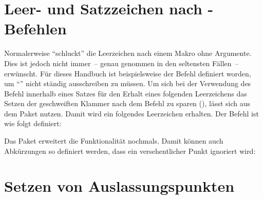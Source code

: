 \section{%
  Leer- und Satzzeichen nach -Befehlen%
  \label{sec:tips:xspace}%
}

Normalerweise \enquote{schluckt}  die Leerzeichen nach einem 
Makro ohne Argumente. Dies ist jedoch nicht immer~-- genau genommen in den 
seltensten Fällen~-- erwünscht. Für dieses Handbuch ist beispielsweise der 
Befehl  definiert worden, um \enquote{\TUD{}} nicht ständig 
ausschreiben zu müssen. Um sich bei der Verwendung des Befehl innerhalb eines 
Satzes für den Erhalt eines folgenden Leerzeichens das Setzen der geschweiften 
Klammer nach dem Befehl zu sparen (), lässt sich 
 aus dem Paket  nutzen. Damit wird ein folgendes 
Leerzeichen erhalten. Der Befehl  ist wie folgt definiert:
%
\begin{quoting}
\begin{Code}
\newcommand*{\TUD}{Technische Universit\"at Dresden\xspace}
\end{Code}
\end{quoting}
%
Das Paket  erweitert die Funktionalität nochmals. Damit 
können auch Abkürzungen so definiert werden, dass ein versehentlicher Punkt 
ignoriert wird:
%
\begin{quoting}
\begin{Code}
\newcommand*{\zB}{z.\,B\xperiod}
\end{Code}
\end{quoting}



\section{%
  Setzen von Auslassungspunkten%
  \label{sec:tips:dots}%
}

